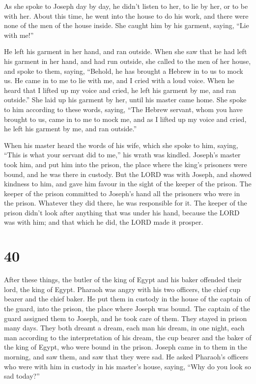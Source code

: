  As she spoke to Joseph day by day, he didn't listen to
her, to lie by her, or to be with her.  About this time,
he went into the house to do his work, and there were none of the men of
the house inside.  She caught him by his garment, saying,
``Lie with me!''

He left his garment in her hand, and ran outside.  When
she saw that he had left his garment in her hand, and had run outside,
 she called to the men of her house, and spoke to them,
saying, ``Behold, he has brought a Hebrew in to us to mock us. He came
in to me to lie with me, and I cried with a loud voice. 
When he heard that I lifted up my voice and cried, he left his garment
by me, and ran outside.''  She laid up his garment by
her, until his master came home.  She spoke to him
according to these words, saying, ``The Hebrew servant, whom you have
brought to us, came in to me to mock me,  and as I lifted
up my voice and cried, he left his garment by me, and ran outside.''

 When his master heard the words of his wife, which she
spoke to him, saying, ``This is what your servant did to me,'' his wrath
was kindled.  Joseph's master took him, and put him into
the prison, the place where the king's prisoners were bound, and he was
there in custody.  But the LORD was with Joseph, and
showed kindness to him, and gave him favour in the sight of the keeper
of the prison.  The keeper of the prison committed to
Joseph's hand all the prisoners who were in the prison. Whatever they
did there, he was responsible for it.  The keeper of the
prison didn't look after anything that was under his hand, because the
LORD was with him; and that which he did, the LORD made it prosper.

\hypertarget{section-39}{%
\section{40}\label{section-39}}

 After these things, the butler of the king of Egypt and
his baker offended their lord, the king of Egypt.  Pharaoh
was angry with his two officers, the chief cup bearer and the chief
baker.  He put them in custody in the house of the captain
of the guard, into the prison, the place where Joseph was bound.
 The captain of the guard assigned them to Joseph, and he
took care of them. They stayed in prison many days.  They
both dreamt a dream, each man his dream, in one night, each man
according to the interpretation of his dream, the cup bearer and the
baker of the king of Egypt, who were bound in the prison. 
Joseph came in to them in the morning, and saw them, and saw that they
were sad.  He asked Pharaoh's officers who were with him
in custody in his master's house, saying, ``Why do you look so sad
today?''

